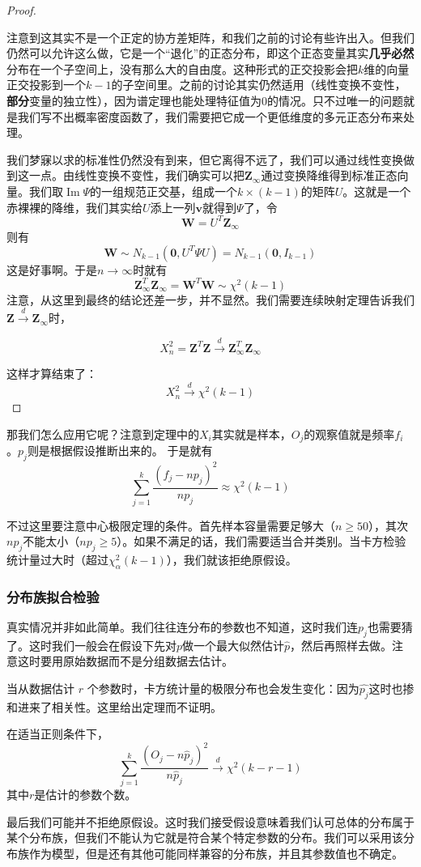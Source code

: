 \begin{proof}
\begin{attention}
注意到这其实不是一个正定的协方差矩阵，和我们之前的讨论有些许出入。但我们仍然可以允许这么做，它是一个“退化”的正态分布，即这个正态变量其实\textbf{几乎必然}分布在一个子空间上，没有那么大的自由度。这种形式的正交投影会把$k$维的向量正交投影到一个$k-1$的子空间里。之前的讨论其实仍然适用（线性变换不变性，\textbf{部分}变量的独立性），因为谱定理也能处理特征值为$0$的情况。只不过唯一的问题就是我们写不出概率密度函数了，我们需要把它成一个更低维度的多元正态分布来处理。
\end{attention}
    
我们梦寐以求的标准性仍然没有到来，但它离得不远了，我们可以通过线性变换做到这一点。由线性变换不变性，我们确实可以把$\mathbf{Z}_{\infty}$通过变换降维得到标准正态向量。我们取$\operatorname{Im}\Psi$的一组规范正交基，组成一个$k \times (k-1)$的矩阵$U$。这就是一个赤裸裸的降维，我们其实给$U$添上一列$\mathbf{v}$就得到$\Psi$了，令
\[
\mathbf{W}=U^T\mathbf{Z}_{\infty}
\]
则有
\[
\mathbf{W}\sim N_{k-1}(\mathbf{0},U^T\Psi U)=N_{k-1}(\mathbf{0},I_{k-1})
\]
这是好事啊。于是$n\to\infty$时就有
\[
\mathbf{Z}_{\infty}^T\mathbf{Z}_{\infty} = \mathbf{W}^T\mathbf{W} \sim \chi^2(k-1)
\]
注意，从这里到最终的结论还差一步，并不显然。我们需要连续映射定理告诉我们$\mathbf{Z}\xrightarrow{d} \mathbf{Z}_\infty$时，

\[
X_n^2=\mathbf{Z}^T\mathbf{Z} \xrightarrow{d} \mathbf{Z}_{\infty}^T\mathbf{Z}_{\infty}
\]

这样才算结束了：
\[
X_n^2 \xrightarrow{d} \chi^2(k-1)
\]

\end{proof}

那我们怎么应用它呢？注意到定理中的$X_i$其实就是样本，$O_j$的观察值就是频率$f_i$。$p_j$则是根据假设推断出来的。
于是就有
\[
\sum_{j=1}^k\frac{(f_j-np_j)^2}{np_j} \approx \chi^2(k-1)
\]

不过这里要注意中心极限定理的条件。首先样本容量需要足够大（$n\geq 50$），其次$np_j$不能太小（$np_j\geq 5$）。如果不满足的话，我们需要适当合并类别。当卡方检验统计量过大时（超过$\chi^2_\alpha(k-1)$），我们就该拒绝原假设。

\subsubsection{分布族拟合检验}
真实情况并非如此简单。我们往往连分布的参数也不知道，这时我们连$p_j$也需要猜了。这时我们一般会在假设下先对$p$做一个最大似然估计$\hat{p}$，然后再照样去做。注意这时要用原始数据而不是分组数据去估计。

当从数据估计 $r$ 个参数时，卡方统计量的极限分布也会发生变化：因为$\hat{p_j}$这时也掺和进来了相关性。这里给出定理而不证明。

\begin{theorem}
在适当正则条件下，
\[
\sum_{j=1}^k\frac{(O_j-n\hat{p}_j)^2}{n\hat{p}_j} \xrightarrow{d} \chi^2(k-r-1)
\]
其中$r$是估计的参数个数。
\end{theorem}

最后我们可能并不拒绝原假设。这时我们接受假设意味着我们认可总体的分布属于某个分布族，但我们不能认为它就是符合某个特定参数的分布。我们可以采用该分布族作为模型，但是还有其他可能同样兼容的分布族，并且其参数值也不确定。

